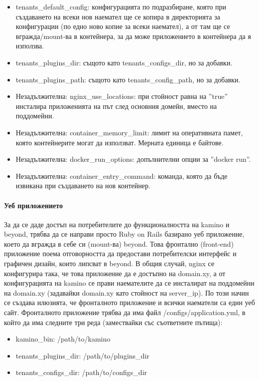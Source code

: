 \documentclass[pdftex,14pt,a4paper]{extreport}
\begin{document}
\begin{itemize}
  \item tenants\_default\_config: конфигурацията по подразбиране, която при създаването на всеки нов наемател ще се копира в директорията за конфигурации (по едно ново копие за всеки наемател), а от там ще се вгражда/mount-ва в контейнера, за да може приложението в контейнера да я използва.
  \item tenants\_plugins\_dir: същото като tenants\_configs\_dir, но за добавки.
  \item tenants\_plugins\_path: същото като tenants\_config\_path, но за добавки.
  \item Незадължителна: nginx\_use\_locations: при стойност равна на ''true'' инсталира приложенията на път след основния домейн, вместо на поддомейни.
  \item Незадължителна: container\_memory\_limit: лимит на оперативната памет, която контейнерите могат да използват. Мерната единица е байтове.
  \item Незадължителна: docker\_run\_options: допълнителни опции за ''docker run''.
  \item Незадължителна: container\_entry\_command: команда, която да бъде извикана при създаването на нов контейнер.
\end{itemize}
\paragraph {Уеб приложението\\}
За да се даде достъп на потребителите до функционалността на kamino и beyond, трябва да се направи просто Ruby on Rails базирано уеб приложение, което да вгражда в себе си (mount-ва) beyond. Това фронтално (front-end) приложение поема отговорността да предостави потребителски интерфейс и графичен дизайн, които липсват в beyond. В общия случай, nginx се конфигурира така, че това приложение да е достъпно на domain.xy, а от конфигурацията на kamino се прави наемателите да се инсталират на поддомейни на domain.xy (задавайки domain.xy като стойност на server\_ip). По този начин се създава илюзията, че фронталното приложение и всички наематели са един уеб сайт. Фронталното приложение трябва да има файл /configs/application.yml, в който да има следните три реда (замествайки със съответните пътища):
\begin{itemize}
  \item kamino\_bin: /path/to/kamino
  \item tenants\_plugins\_dir: /path/to/plugins\_dir
  \item tenants\_configs\_dir: /path/to/configs\_dir
\end{itemize}
\end{document}
